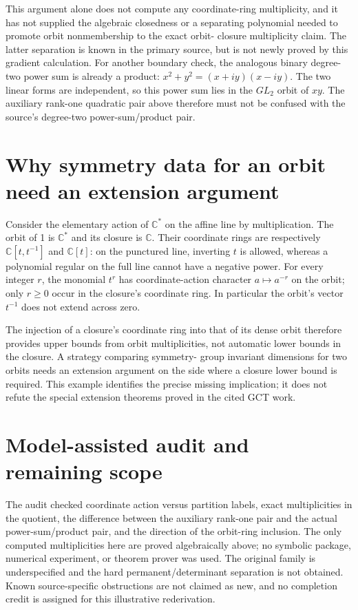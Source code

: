 \documentclass[11pt]{article}
\begin{document}
This argument alone does not compute any coordinate-ring multiplicity,
and it has not supplied the algebraic closedness or a separating
polynomial needed to promote orbit nonmembership to the exact orbit-
closure multiplicity claim. The latter separation is known in the
primary source, but is not newly proved by this gradient calculation.
For another boundary check, the analogous binary degree-two power
sum is already a product:
$x^2+y^2=(x+iy)(x-iy)$. The two linear forms are independent,
so this power sum lies in the $GL_2$ orbit of $xy$.
The auxiliary rank-one quadratic pair above therefore must not be
confused with the source's degree-two power-sum/product pair.

\section{Why symmetry data for an orbit need an extension argument}
Consider the elementary action of $\mathbb C^*$ on the affine line
by multiplication. The orbit of 1 is $\mathbb C^*$ and its closure
is $\mathbb C$. Their coordinate rings are respectively
$\mathbb C[t,t^{-1}]$ and $\mathbb C[t]$: on the punctured line,
inverting $t$ is allowed, whereas a polynomial regular on the full
line cannot have a negative power. For every integer $r$, the monomial
$t^r$ has coordinate-action character $a\mapsto a^{-r}$ on the orbit;
only $r\ge0$ occur in the closure's coordinate ring. In particular
the orbit's vector $t^{-1}$ does not extend across zero.

The injection of a closure's coordinate ring into that of its dense
orbit therefore provides upper bounds from orbit multiplicities, not
automatic lower bounds in the closure. A strategy comparing symmetry-
group invariant dimensions for two orbits needs an extension argument
on the side where a closure lower bound is required. This example
identifies the precise missing implication; it does not refute the
special extension theorems proved in the cited GCT work.

\section{Model-assisted audit and remaining scope}
The audit checked coordinate action versus partition labels, exact
multiplicities in the quotient, the difference between the auxiliary
rank-one pair and the actual power-sum/product pair, and the direction
of the orbit-ring inclusion. The only computed multiplicities here
are proved algebraically above; no symbolic package, numerical
experiment, or theorem prover was used. The original family is
underspecified and the hard permanent/determinant separation is not
obtained. Known source-specific obstructions are not claimed as new,
and no completion credit is assigned for this illustrative rederivation.
\end{document}
